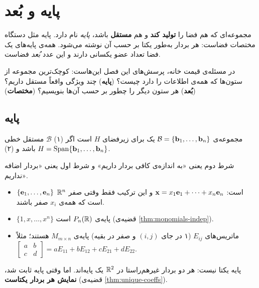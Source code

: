 \chapter{پایه و بُعد}
\label{ch:basis}

مجموعه‌ای که هم فضا را \textbf{تولید کند} و هم \textbf{مستقل} باشد، \emph{پایه} نام دارد. پایه مثل دستگاه مختصات فضاست: هر بردار به‌طور یکتا بر حسب آن نوشته می‌شود. همه‌ی پایه‌های یک فضا تعداد عضو یکسانی دارند و این عدد \emph{بُعد} فضاست.

در مسئله‌ی قیمت خانه، پرسش‌های این فصل این‌هاست: کوچک‌ترین مجموعه از ستون‌ها که همه‌ی اطلاعات را دارد چیست؟ (\textbf{پایه}) چند ویژگی واقعاً مستقل داریم؟ (\textbf{بُعد}) هر ستون دیگر را چطور بر حسب آن‌ها بنویسیم؟ (\textbf{مختصات})

\section{پایه}

\begin{definition}[پایه]
مجموعه‌ی $\mathcal{B}=\{\mathbf{b}_1,\dots,\mathbf{b}_n\}$ یک  برای زیرفضای  $H$ است اگر
(۱) $\mathcal{B}$ مستقل خطی  باشد و (۲) $H=\operatorname{Span}\{\mathbf{b}_1,\dots,\mathbf{b}_n\}$.
\end{definition}

شرط دوم یعنی «به اندازه‌ی کافی بردار داریم» و شرط اول یعنی «بردار اضافه نداریم».

\begin{example}
\begin{itemize}
  \item $\{\mathbf{e}_1,\dots,\mathbf{e}_n\}$  $\mathbb{R}^n$ است: $\mathbf{x}=x_1\mathbf{e}_1+\dots+x_n\mathbf{e}_n$ و این ترکیب فقط وقتی صفر است که همه‌ی $x_i$ صفر باشند.
  \item $\{1,x,\dots,x^n\}$ پایه‌ی $P_n(\mathbb{R})$ است (قضیه‌ی \ref{thm:monomials-indep}).
  \item ماتریس‌های $E_{ij}$ (۱ در جای $(i,j)$ و صفر در بقیه) پایه‌ی $M_{m\times n}$ هستند؛ مثلاً $\begin{bmatrix}a&b\\c&d\end{bmatrix}=aE_{11}+bE_{12}+cE_{21}+dE_{22}$.
\end{itemize}
\end{example}

\begin{warning}
پایه یکتا نیست: هر دو بردار غیرهم‌راستا در $\mathbb{R}^2$ یک پایه‌اند. اما وقتی پایه ثابت شد، \textbf{نمایش هر بردار یکتاست} (قضیه‌ی \ref{thm:unique-coeffs}).
\end{warning}

